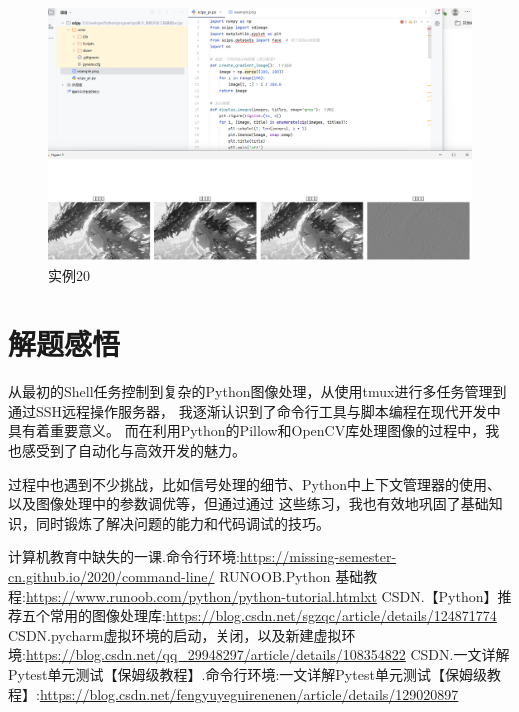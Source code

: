 \documentclass[cn,12pt]{report}
\begin{document}
{      \begin{figure}[htbp]
    \centering
    \includegraphics[width=1\textwidth]{image/19.png}
    \caption{实例20}
  \end{figure}
\FloatBarrier
}

\section{解题感悟}

从最初的Shell任务控制到复杂的Python图像处理，从使用tmux进行多任务管理到通过SSH远程操作服务器，
我逐渐认识到了命令行工具与脚本编程在现代开发中具有着重要意义。
而在利用Python的Pillow和OpenCV库处理图像的过程中，我也感受到了自动化与高效开发的魅力。

过程中也遇到不少挑战，比如信号处理的细节、Python中上下文管理器的使用、
以及图像处理中的参数调优等，但通过通过
这些练习，我也有效地巩固了基础知识，同时锻炼了解决问题的能力和代码调试的技巧。

\begin{thebibliography}{99}
\bibitem{} 计算机教育中缺失的一课.命令行环境:\href{https://missing-semester-cn.github.io/2020/command-line/}{https://missing-semester-cn.github.io/2020/command-line/}
\bibitem{} RUNOOB.Python 基础教程:\href{https://www.runoob.com/python/python-tutorial.html}{https://www.runoob.com/python/python-tutorial.htmlxt}
\bibitem{} CSDN.【Python】推荐五个常用的图像处理库:\href{https://blog.csdn.net/sgzqc/article/details/124871774}{https://blog.csdn.net/sgzqc/article/details/124871774}
\bibitem{} CSDN.pycharm虚拟环境的启动，关闭，以及新建虚拟环境:\href{https://blog.csdn.net/qq_29948297/article/details/108354822}{https://blog.csdn.net/qq\_{}29948297/article/details/108354822}
\bibitem{} CSDN.一文详解Pytest单元测试【保姆级教程】.命令行环境:一文详解Pytest单元测试【保姆级教程】:\href{https://blog.csdn.net/fengyuyeguirenenen/article/details/129020897}{https://blog.csdn.net/fengyuyeguirenenen/article/details/129020897}
\end{thebibliography}
\end{document}
